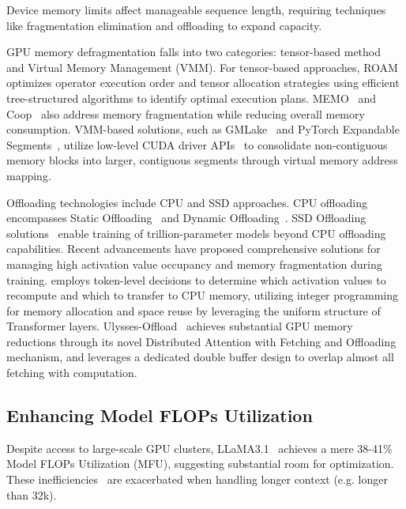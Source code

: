Device memory limits affect manageable sequence length, requiring techniques like fragmentation elimination and offloading to expand capacity.

GPU memory defragmentation falls into two categories: tensor-based method~\citep{Kirisame2020DynamicTR, Hu2022MegTaiChiDT, shu2023roam, zhao2024efficientlytraining7bllm, zhang2024coop} and Virtual Memory Management (VMM). For tensor-based approaches, ROAM~\citep{shu2023roam} optimizes operator execution order and tensor allocation strategies using efficient tree-structured algorithms to identify optimal execution plans. MEMO~\citep{zhao2024efficientlytraining7bllm} and Coop~\citep{zhang2024coop} also address memory fragmentation while reducing overall memory consumption. VMM-based solutions, such as GMLake~\citep{guo2024gmlake} and PyTorch Expandable Segments~\citep{PyTorch2024Expandable_Segments}, utilize low-level CUDA driver APIs~\citep{CUDA2020virtual} to consolidate non-contiguous memory blocks into larger, contiguous segments through virtual memory address mapping.

Offloading technologies include CPU and SSD approaches. CPU offloading encompasses Static Offloading~\citep{pudipeddi2020training, ren2021zero} and Dynamic Offloading~\citep{sun2022stronghold, li2022harmony}. SSD Offloading solutions~\citep{rajbhandari2021zero, jang2024smart, liao2024adding} enable training of trillion-parameter models beyond CPU offloading capabilities.
Recent advancements have proposed comprehensive solutions for managing high activation value occupancy and memory fragmentation during training. \citet{zhao2024efficientlytraining7bllm} employs token-level decisions to determine which activation values to recompute and which to transfer to CPU memory, utilizing integer programming for memory allocation and space reuse by leveraging the uniform structure of Transformer layers. Ulysses-Offload~\citep{yao2024training} achieves substantial GPU memory reductions through its novel Distributed Attention with Fetching and Offloading mechanism, and leverages a dedicated double buffer design to overlap almost all fetching with computation.

\subsection{Enhancing Model FLOPs Utilization}\label{sec6_3}

Despite access to large-scale GPU clusters, LLaMA3.1~\citep{dubey2024llama} achieves a mere 38-41\% Model FLOPs Utilization (MFU), suggesting substantial room for optimization. These inefficiencies~\citep{duan2024efficient} are exacerbated when handling longer context (e.g. longer than 32k).


